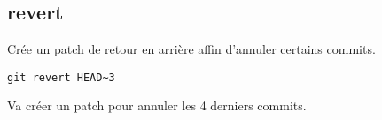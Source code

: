 \subsection*{revert}
Crée un patch de retour en arrière affin d'annuler certains commits.

\begin{verbatim}
git revert HEAD~3
\end{verbatim}
Va créer un patch pour annuler les 4 derniers commits.


